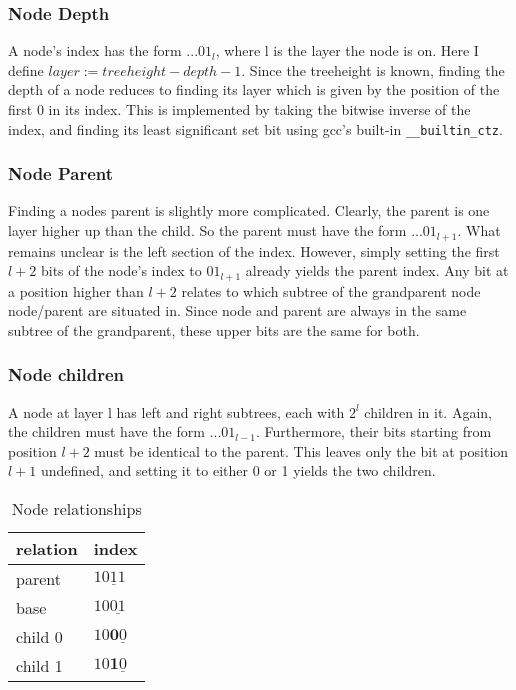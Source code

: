 \documentclass[twoside,twocolumn,hidelinks]{article}
\begin{document}
\subsubsection{Node Depth}
A node's index has the form $...01_l$, where l is the layer the node is on. Here I define $layer := treeheight - depth - 1$. Since the treeheight is known, finding the depth of a node reduces to finding its layer which is given by the position of the first 0 in its index. This is implemented by taking the bitwise inverse of the index, and finding its least significant set bit using gcc's built-in \texttt{\_\_builtin\_ctz}.

\subsubsection{Node Parent}
Finding a nodes parent is slightly more complicated. Clearly, the parent is one layer higher up than the child. So the parent must have the form $...01_{l+1}$. What remains unclear is the left section of the index. However, simply setting the first $l+2$ bits of the node's index to $01_{l+1}$ already yields the parent index. Any bit at a position higher than $l+2$ relates to which subtree of the grandparent node node/parent are situated in. Since node and parent are always in the same subtree of the grandparent, these upper bits are the same for both.

\subsubsection{Node children}
A node at layer l has left and right subtrees, each with $2^l$ children in it. Again, the children must have the form $...01_{l-1}$. Furthermore, their bits starting from position $l+2$ must be identical to the parent. This leaves only the bit at position $l+1$ undefined, and setting it to either 0 or 1 yields the two children.

\begin{table}[h]
      \centering
      \begin{tabular}{ll}
            \toprule
            relation & index \\
            \midrule
            parent & $1\underline{011}$  \\
            base   & $10\underline{01}$  \\
            child 0 & $10\mathbf{0}\underline{0}$  \\
            child 1 & $10\mathbf{1}\underline{0}$  \\
            \bottomrule
      \end{tabular}
      \caption{Node relationships}
\end{table}
\end{document}
